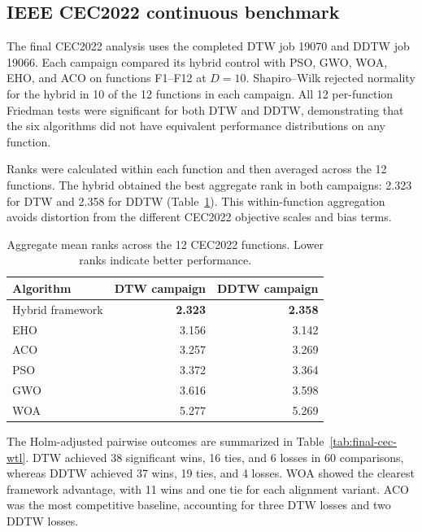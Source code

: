 \documentclass[review]{elsarticle}
\begin{document}
\subsection{IEEE CEC2022 continuous benchmark}
\label{sec:final-stat-cec2022}

The final CEC2022 analysis uses the completed DTW job 19070 and DDTW job
19066. Each campaign compared its hybrid control with PSO, GWO, WOA, EHO, and
ACO on functions F1--F12 at $D=10$. Shapiro--Wilk rejected normality for the
hybrid in 10 of the 12 functions in each campaign. All 12 per-function
Friedman tests were significant for both DTW and DDTW, demonstrating that the
six algorithms did not have equivalent performance distributions on any
function.

Ranks were calculated within each function and then averaged across the 12
functions. The hybrid obtained the best aggregate rank in both campaigns:
2.323 for DTW and 2.358 for DDTW (Table~\ref{tab:final-cec-ranks}). This
within-function aggregation avoids distortion from the different CEC2022
objective scales and bias terms.

\begin{table}[htbp]
\centering
\caption{Aggregate mean ranks across the 12 CEC2022 functions. Lower ranks
indicate better performance.}
\label{tab:final-cec-ranks}
\begin{tabular}{lrr}
\toprule
Algorithm & DTW campaign & DDTW campaign \\
\midrule
Hybrid framework & \textbf{2.323} & \textbf{2.358} \\
EHO              & 3.156 & 3.142 \\
ACO              & 3.257 & 3.269 \\
PSO              & 3.372 & 3.364 \\
GWO              & 3.616 & 3.598 \\
WOA              & 5.277 & 5.269 \\
\bottomrule
\end{tabular}
\end{table}

The Holm-adjusted pairwise outcomes are summarized in
Table~\ref{tab:final-cec-wtl}. DTW achieved 38 significant wins, 16 ties, and
6 losses in 60 comparisons, whereas DDTW achieved 37 wins, 19 ties, and 4
losses. WOA showed the clearest framework advantage, with 11 wins and one tie
for each alignment variant. ACO was the most competitive baseline, accounting
for three DTW losses and two DDTW losses.
\end{document}
